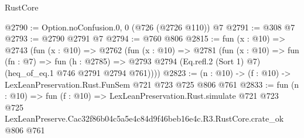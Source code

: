 \begin{lexlean}{RustCore}
\begin{coremodule}
@2790 := Option.noConfusion.{0, 0} (@726 (@2726 @110)) @7
@2791 := @308 @7
@2793 := @2790 @2791 @7
@2794 := @760 @806
@2815 := fun (x : @10) =>
  @2743
    (fun (x : @10) =>
    @2762
      (fun (x : @10) =>
      @2781
        (fun (x : @10) =>
        fun (fn : @7) =>
        fun (h : @2785) =>
        @2793 @2794 (Eq.refl.{2} (Sort 1) @7) (heq_of_eq.{1} @746 @2791 @2794 @761))))
@2823 := (n : @10) -> (f : @10) -> LexLeanPreservation.Rust.FunSem @721 @723 @725 @806 @761
@2833 := fun (n : @10) =>
  fun (f : @10) =>
  LexLeanPreservation.Rust.simulate
    @721
    @723
    @725
    LexLeanPreserve.Cac32f86b04c5a5e4c84d9f46beb16e4c.R3.RustCore.crate_ok
    @806
    @761
\end{coremodule}
\end{lexlean}
